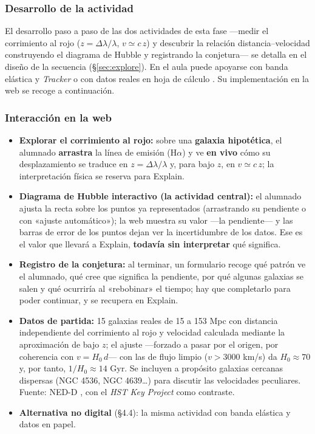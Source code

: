 \subsubsection*{Desarrollo de la actividad}

El desarrollo paso a paso de las dos actividades de esta fase ---medir el corrimiento al rojo ($z = \Delta\lambda/\lambda$, $v \simeq c\,z$) y descubrir la relación distancia--velocidad construyendo el diagrama de Hubble y registrando la conjetura--- se detalla en el diseño de la secuencia (§\ref{sec:explore}). En el aula puede apoyarse con banda elástica y \textit{Tracker} \parencite{suarez2025} o con datos reales en hoja de cálculo \parencite{cardona2016,hyde2021}. Su implementación en la web se recoge a continuación.

\subsubsection*{Interacción en la web}

\begin{itemize}
\item \textbf{Explorar el corrimiento al rojo:} sobre una \textbf{galaxia hipotética}, el alumnado \textbf{arrastra} la línea de emisión (H$\alpha$) y ve \textbf{en vivo} cómo su desplazamiento se traduce en $z = \Delta\lambda/\lambda$ y, para bajo $z$, en $v \simeq c\,z$; la interpretación física se reserva para Explain.
\item \textbf{Diagrama de Hubble interactivo (la actividad central):} el alumnado ajusta la recta sobre los puntos ya representados (arrastrando su pendiente o con «ajuste automático»); la web muestra su valor ---la pendiente--- y las barras de error de los puntos dejan ver la incertidumbre de los datos. Ese es el valor que llevará a Explain, \textbf{todavía sin interpretar} qué significa.
\item \textbf{Registro de la conjetura:} al terminar, un formulario recoge qué patrón ve el alumnado, qué cree que significa la pendiente, por qué algunas galaxias se salen y qué ocurriría al «rebobinar» el tiempo; hay que completarlo para poder continuar, y se recupera en Explain.
\item \textbf{Datos de partida:} 15 galaxias reales de 15 a 153 Mpc con distancia independiente del corrimiento al rojo y velocidad calculada mediante la aproximación de bajo $z$; el ajuste ---forzado a pasar por el origen, por coherencia con $v=H_{0}\,d$--- con las de flujo limpio ($v > 3000$ km/s) da $H_{0} \approx 70$ y, por tanto, $1/H_{0} \approx 14$ Gyr. Se incluyen a propósito galaxias cercanas dispersas (NGC 4536, NGC 4639\ldots) para discutir las velocidades peculiares. Fuente: NED-D \parencite{steer2017}, con el \textit{HST Key Project} \parencite{freedman2001} como contraste.
\item \textbf{Alternativa no digital} (§4.4): la misma actividad con banda elástica y datos en papel.
\end{itemize}

